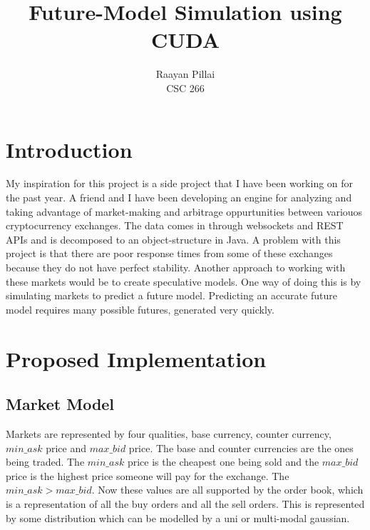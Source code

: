 \documentclass[12pt]{article}
\begin{document}
 
 
 
\title{
Future-Model Simulation using CUDA
}
\author{
Raayan Pillai %
\\
CSC 266 %
} %
\maketitle
 
\section{Introduction}
My inspiration for this project is a side project that I have been working on for the past year. 
A friend and I have been developing an engine for analyzing and taking advantage of market-making and arbitrage oppurtunities between variouos cryptocurrency exchanges. 
The data comes in through  websockets and REST APIs and is decomposed to an object-structure in Java. 
A problem with this project is that there are poor response times from some of these exchanges because they do not have perfect stability. 
Another approach to working with these markets would be to create speculative models. 
One way of doing this is by simulating markets to predict a future model.
Predicting an accurate future model requires many possible futures, generated very quickly.

\section{Proposed Implementation}
\subsection{Market Model}
Markets are represented by four qualities, base currency, counter currency, $min\_ask$ price and $max\_bid$ price. 
The base and counter currencies are the ones being traded. 
The $min\_ask$ price is the cheapest one being sold and the $max\_bid$ price is the highest price someone will pay for the exchange. 
The $min\_ask > max\_bid$. 
Now these values are all supported by the order book, which is a representation of all the buy orders and all the sell orders. 
This is represented by some distribution which can be modelled by a uni or multi-modal gaussian. 
\end{document}
